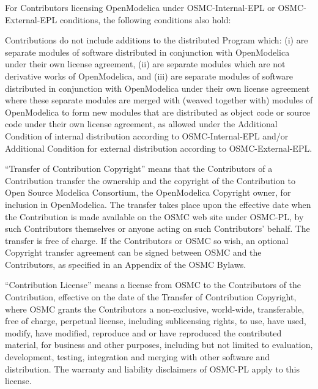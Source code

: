 \documentclass[a4paper, 12pt]{article}
\begin{document}
For Contributors licensing OpenModelica under OSMC-Internal-EPL or OSMC-External-EPL conditions, the following conditions also hold:
\vspace{0.2cm}

Contributions do not include additions to the distributed Program which: (i) are separate modules of software distributed in conjunction with OpenModelica under their own license agreement, (ii) are separate modules which are not derivative works of OpenModelica, and (iii) are separate modules of software distributed in conjunction with OpenModelica under their own license agreement where these separate modules are merged with (weaved together with) modules of OpenModelica to form new modules that are distributed as object code or source code under their own license agreement, as allowed under the Additional Condition of internal distribution according to OSMC-Internal-EPL and/or Additional Condition for external distribution according to OSMC-External-EPL.

\vspace{0.5cm}

``Transfer of Contribution Copyright'' means that the Contributors of a Contribution transfer the ownership and the copyright of the Contribution to Open Source Modelica Consortium, the OpenModelica Copyright owner, for inclusion in OpenModelica. The transfer takes place upon the effective date when the Contribution is made available on the OSMC web site under OSMC-PL, by such Contributors themselves or anyone acting on such Contributors' behalf. The transfer is free of charge. If the Contributors or OSMC so wish, an optional Copyright transfer agreement can be signed between OSMC and the Contributors, as specified in an Appendix of the OSMC Bylaws.

\vspace{0.5cm}

``Contribution License'' means a license from OSMC to the Contributors of the Contribution, effective on the date of the Transfer of Contribution Copyright, where OSMC grants the Contributors a non-exclusive, world-wide, transferable, free of charge, perpetual license, including sublicensing rights, to use, have used, modify, have modified, reproduce and or have reproduced the contributed material, for business and other purposes, including but not limited to evaluation, development, testing, integration and merging with other software and distribution. The warranty and liability disclaimers of OSMC-PL apply to this license.
\end{document}
